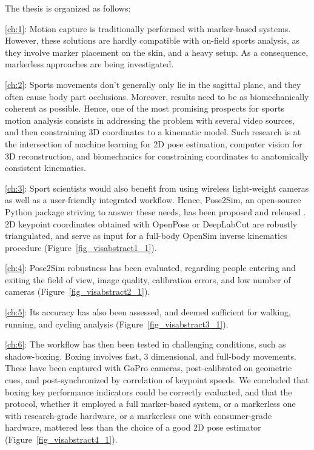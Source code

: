 \newpage


The thesis is organized as follows:

\vspace*{0.2cm}
\noindent\autoref{ch:1}: Motion capture is traditionally performed with marker-based systems. However, these solutions are hardly compatible with on-field sports analysis, as they involve marker placement on the skin, and a heavy setup. As a consequence, markerless approaches are being investigated. 

\vspace*{0.2cm}
\noindent\autoref{ch:2}: Sports movements don’t generally only lie in the sagittal plane, and they often cause body part occlusions. Moreover, results need to be as biomechanically coherent as possible. Hence, one of the most promising prospects for sports motion analysis consists in addressing the problem with several video sources, and then constraining 3D coordinates to a kinematic model.  Such research is at the intersection of machine learning for 2D pose estimation, computer vision for 3D reconstruction, and biomechanics for constraining coordinates to anatomically consistent kinematics. 

\vspace*{0.2cm}
\noindent\autoref{ch:3}: Sport scientists would also benefit from using wireless light-weight cameras as well as a user-friendly integrated workflow. Hence, Pose2Sim, an open-source Python package striving to answer these needs, has been proposed and released \cite{Pagnon2022b}. 2D keypoint coordinates obtained with OpenPose or DeepLabCut are robustly triangulated, and serve as input for a full-body OpenSim inverse kinematics procedure (Figure~\ref{fig_visabstract1_1}).

\vspace*{0.2cm}
\noindent\autoref{ch:4}: Pose2Sim robustness has been evaluated, regarding people entering and exiting the field of view, image quality, calibration errors, and low number of cameras \cite{Pagnon2021} (Figure~\ref{fig_visabstract2_1}). 

\vspace*{0.2cm}
\noindent\autoref{ch:5}: Its accuracy has also been assessed, and deemed sufficient for walking, running, and cycling analysis \cite{Pagnon2022a} (Figure~\ref{fig_visabstract3_1}). 

\vspace*{0.2cm}
\noindent\autoref{ch:6}: The workflow has then been tested in challenging conditions, such as shadow-boxing. Boxing involves fast, 3 dimensional, and full-body movements. These have been captured with GoPro cameras, post-calibrated on geometric cues, and post-synchronized by correlation of keypoint speeds. We concluded that boxing key performance indicators could be correctly evaluated, and that the protocol, whether it employed a full marker-based system, or a markerless one with research-grade hardware, or a markerless one with consumer-grade hardware, mattered less than the choice of a good 2D pose estimator \cite{Pagnon2022c} (Figure~\ref{fig_visabstract4_1}).  

